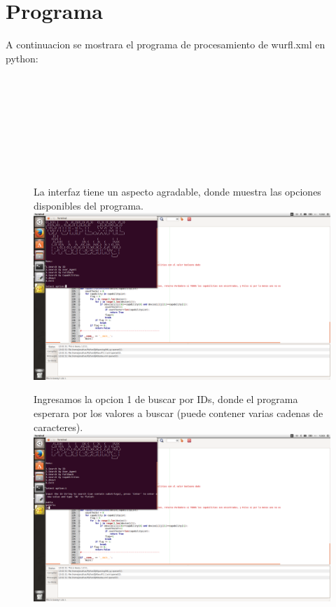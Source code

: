 \documentclass[14pt]{article} %
\begin{document}
\section{ Programa}
A continuacion se mostrara el programa de procesamiento de wurfl.xml en python:\\\\\\\\\\\\\\\\\\

\begin{figure}
La interfaz tiene un aspecto agradable, donde muestra las opciones disponibles del programa.
\centering
\includegraphics[scale=0.22]{imagenes/sc1.png}
\end{figure}

\begin{figure}
Ingresamos la opcion 1 de buscar por IDs, donde el programa esperara por los valores a buscar (puede contener varias cadenas de caracteres).
\centering
\includegraphics[scale=0.22]{imagenes/sc2.png}
\end{figure}
\end{document}
